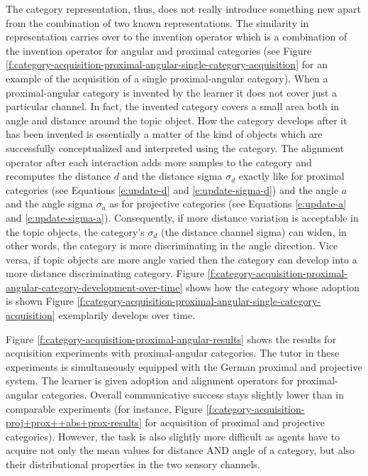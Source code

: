 The category representation, thus, does not really introduce something 
new apart from the combination of two known representations. The similarity in 
representation carries over to the invention operator which is a combination of 
the invention operator for angular and proximal categories 
(see Figure \ref{f:category-acquisition-proximal-angular-single-category-acquisition} 
for an example of the acquisition of a single proximal-angular category).
When a proximal-angular category is invented by the learner it does not cover just a
particular channel. In fact, the invented category covers a small area both 
in angle and distance around the topic object. How the category develops after it has been invented is essentially a matter of the kind of objects which are successfully conceptualized and
interpreted using the category. The alignment operator after each interaction adds more samples 
to the category and recomputes the distance $d$ 
and the distance sigma $\sigma_d$ exactly like for proximal categories
(see Equations \ref{e:update-d} and \ref{e:update-sigma-d}) and 
the angle $a$ and the angle sigma $\sigma_a$ as for projective categories 
(see Equations \ref{e:update-a} and \ref{e:update-sigma-a}). 
Consequently, if more distance variation is acceptable
in the topic objects, the category's $\sigma_d$ (the distance channel sigma) 
can widen, in other words, the category is more discriminating in the angle direction. 
Vice versa, if topic objects are more angle varied then the category can 
develop into a more distance discriminating category. Figure 
\ref{f:category-acquisition-proximal-angular-category-development-over-time} shows how 
the category whose adoption is shown Figure \ref{f:category-acquisition-proximal-angular-single-category-acquisition} exemplarily develops over time. 

Figure \ref{f:category-acquisition-proximal-angular-results} 
shows the results for acquisition experiments with proximal-angular 
categories. The tutor in these experiments is simultaneously 
equipped with the German proximal and projective system. 
The learner is given adoption and alignment operators for proximal-angular 
categories. Overall communicative success stays slightly lower than in comparable experiments
(for instance, Figure \ref{f:category-acquisition-proj+prox++abs+prox-results} for acquisition of
proximal and projective categories). However, the task is also slightly
more difficult as agents have to acquire not only the mean values for distance AND angle of a
category, but also their distributional properties in the two sensory channels.

